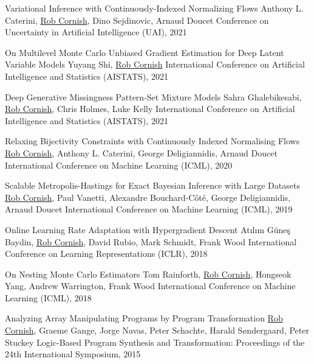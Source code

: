 \documentclass[9pt]{developercv} %
\begin{document}

\newpage


\begin{entrylist}
    \publication
        {Variational Inference with Continuously-Indexed Normalizing Flows}
        {Anthony L. Caterini, \underline{Rob Cornish}, Dino Sejdinovic, Arnaud Doucet}
        {Conference on Uncertainty in Artificial Intelligence (UAI), 2021}

    \publication
        {On Multilevel Monte Carlo Unbiased Gradient Estimation for Deep Latent Variable Models}
        {Yuyang Shi, \underline{Rob Cornish}}
        {International Conference on Artificial Intelligence and Statistics (AISTATS), 2021}

    \publication
        {Deep Generative Missingness Pattern-Set Mixture Models}
        {Sahra Ghalebikesabi, \underline{Rob Cornish}, Chris Holmes, Luke Kelly}
        {International Conference on Artificial Intelligence and Statistics (AISTATS), 2021}

    \publication
        {Relaxing Bijectivity Constraints with Continuously Indexed Normalising Flows}
        {\underline{Rob Cornish}, Anthony L. Caterini, George Deligiannidis, Arnaud Doucet}
        {International Conference on Machine Learning (ICML), 2020}

    \publication
        {Scalable Metropolis-Hastings for Exact Bayesian Inference with Large Datasets}
        {\underline{Rob Cornish}, Paul Vanetti, Alexandre Bouchard-C\^ot\'e, George Deligiannidis, Arnaud Doucet}
        {International Conference on Machine Learning (ICML), 2019}

    \publication
        {Online Learning Rate Adaptation with Hypergradient Descent}
        {At\i l\i m G\"une\c s Baydin, \underline{Rob Cornish}, David Rubio, Mark Schmidt, Frank Wood}
        {International Conference on Learning Representations (ICLR), 2018}

    \publication
        {On Nesting Monte Carlo Estimators}
        {Tom Rainforth, \underline{Rob Cornish}, Hongseok Yang, Andrew Warrington, Frank Wood}
        {International Conference on Machine Learning (ICML), 2018}

    \publication
        {Analyzing Array Manipulating Programs by Program Transformation}
        {\underline{Rob Cornish}, Graeme Gange, Jorge Navas, Peter Schachte, Harald S\o ndergaard, Peter Stuckey}
        {Logic-Based Program Synthesis and Transformation: Proceedings of the 24th International Symposium, 2015}
\end{entrylist}
\end{document}
